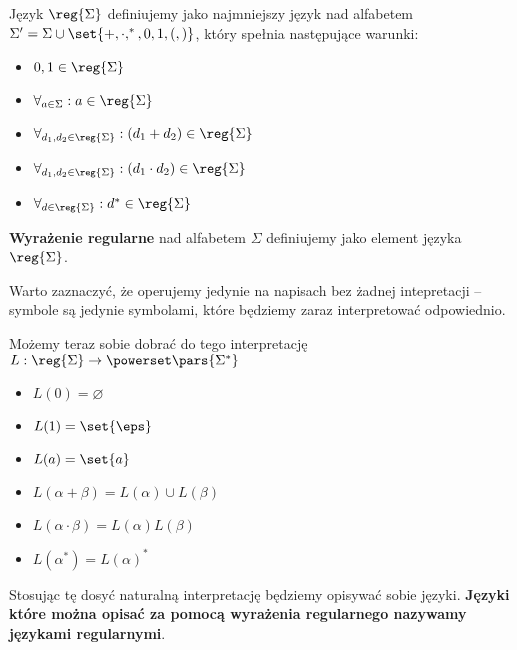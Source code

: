 \begin{definition}
	Język \( \reg{\Sigma} \) definiujemy jako najmniejszy język nad alfabetem \( \Sigma' = \Sigma \cup \set{+, \cdot, ^*, 0, 1, (, )} \), który spełnia następujące warunki:

	\begin{itemize}
		\item \( 0, 1 \in \reg{\Sigma} \)
		\item \( \forall_{a \in \Sigma}: a \in \reg{\Sigma} \)
		\item \( \forall_{d_1, d_2 \in \reg{\Sigma}}: (d_1 + d_2) \in \reg{\Sigma} \)
		\item \( \forall_{d_1, d_2 \in \reg{\Sigma}}: (d_1 \cdot d_2) \in \reg{\Sigma} \)
		\item \( \forall_{d \in \reg{\Sigma}}: d^* \in \reg{\Sigma} \)
	\end{itemize}
\end{definition}

\begin{definition}
	\textbf{Wyrażenie regularne} nad alfabetem \( \Sigma \) definiujemy jako element języka  \( \reg{\Sigma} \).

\end{definition}

Warto zaznaczyć, że operujemy jedynie na napisach bez żadnej intepretacji -- symbole są jedynie symbolami, które będziemy zaraz interpretować odpowiednio.

Możemy teraz sobie dobrać do tego interpretację \( L: \reg{\Sigma} \rightarrow \powerset\pars{\Sigma^*} \)
\begin{itemize}
	\item \( L(0) = \varnothing \)
	\item \( L(1) = \set{\eps} \)
	\item \( L(a) = \set{a} \)
	\item \( L(\alpha + \beta) = L(\alpha) \cup L(\beta) \)
	\item \( L(\alpha \cdot \beta) = L(\alpha)L(\beta) \)
	\item \( L(\alpha^*) = L(\alpha)^* \)
\end{itemize}

Stosując tę dosyć naturalną interpretację będziemy opisywać sobie języki. \textbf{Języki które można opisać za pomocą wyrażenia regularnego nazywamy językami regularnymi}.
